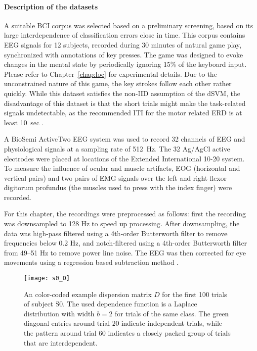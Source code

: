 \paragraph{Description of the datasets}
A suitable \ac{BCI} corpus was selected based on a preliminary screening, based
on its large interdependence of classification errors close in time.
%
This corpus contains \ac{EEG} signals for 12 subjects, recorded during 30
minutes of natural game play, synchronized with annotations of key presses. The
game was designed to evoke changes in the mental state by periodically ignoring
15\% of the keyboard input. Please refer to Chapter~\ref{chap:loc} for
experimental details. Due to the unconstrained nature of this game, the key
strokes follow each other rather quickly. While this dataset satisfies the
non-\ac{IID} assumption of the \ac{dSVM}, the disadvantage of this dataset is
that the short trials might make the task-related signals undetectable, as the
recommended \ac{ITI} for the motor related \ac{ERD} is at least 10~sec
\cite{pfurtscheller1999eem}. 

A BioSemi ActiveTwo \ac{EEG} system was used to record 32 channels of \ac{EEG}
and physiological signals at a sampling rate of 512~Hz. The 32 Ag/AgCl active
electrodes were placed at locations of the Extended International 10-20 system.
To measure the influence of ocular and muscle artifacts, \acs{EOG} (horizontal
and vertical pairs) and two pairs of \acs{EMG} signals over the left and right
flexor digitorum profundus (the muscles used to press with the index finger)
were recorded.

\begin{sloppypar}
For this chapter, the recordings were preprocessed as follows: first the
recording was downsampled to 128 Hz to speed up processing. After downsampling,
the data was high-pass filtered using a 4th-order Butterworth filter to remove
frequencies below 0.2 Hz, and notch-filtered using a 4th-order Butterworth
filter from 49--51 Hz to remove power line noise. The \ac{EEG} was then
corrected for eye movements using a regression  based subtraction method
\cite{schloegl2007fac}.
\end{sloppypar}

\begin{figure}
  \center
  \texttt{[image: s0\_D]}
  \caption{An color-coded example dispersion matrix $D$ for the first 100
  trials of subject S0. The used dependence function is a Laplace distribution
  with width $b=2$ for trials of the same class. The green diagonal entries
  around trial 20 indicate independent trials, while the pattern around trial 60
  indicates a closely packed group of trials that are interdependent.}
  \label{fig:ex_D}
\end{figure}

